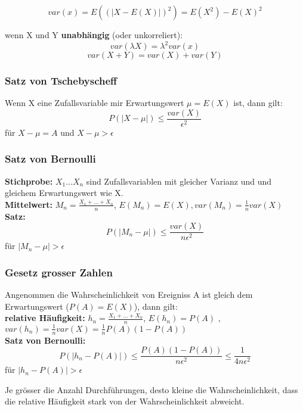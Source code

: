 \documentclass[margin=normal]{tex/hsrzf}
\begin{document}
\begin{multicols}{2}
    $$var(x) = E((|X-E(X)|)^2) = E(X^2) - E(X)^2$$

    wenn X und Y \textbf{unabhängig} (oder unkorreliert):
    $$var(\lambda X) = \lambda^2 var(x)$$
    $$var(X+Y) = var(X) + var(Y)$$

    \subsubsection*{Satz von Tschebyscheff}
    Wenn X eine Zufallsvariable mir Erwartungswert $\mu = E(X)$ ist, dann gilt:
    $$P(|X-\mu|)\leq \frac{var(X)}{\epsilon^2}$$
    für $X-\mu = A$ und $X-\mu > \epsilon$

    \subsubsection*{Satz von Bernoulli}
    \textbf{Stichprobe:} $X_1 \dots X_n$ sind Zufallsvariablen mit gleicher Varianz und und gleichem Erwartungswert wie X.
    \\ \textbf{Mittelwert:} $M_n = \frac{X_1+\dots+ X_n}{n}$, $E(M_n) = E(X), var(M_n) =\frac{1}{n} var(X)$
    \\ \textbf{Satz:} $$P(|M_n -\mu|) \leq \frac{var(X)}{n\epsilon^2} $$
    für $|M_n -\mu| > \epsilon$
    \subsubsection*{Gesetz grosser Zahlen}
    Angenommen die Wahrscheinlichkeit von Ereigniss A ist gleich dem Erwartungswert ($P(A) = E(X)$), dann gilt:
    \\ \textbf{relative Häufigkeit:} $h_n = \frac{X_1+ \dots + X_n}{n}$, $E(h_n) = P(A)$ , $ var(h_n) = \frac{1}{n} var(X) = \frac{1}{n}P(A)(1-P(A))$
    \\ \textbf{Satz von Bernoulli:}
    $$P(|h_n - P(A)|) \leq \frac{P(A)(1-P(A))}{n\epsilon^2} \leq \frac{1}{4n\epsilon^2} $$
    für $|h_n - P(A)| > \epsilon$

    \tiny{Je grösser die Anzahl Durchführungen, desto kleine die Wahrscheinlichkeit, dass die relative Häufigkeit stark von der Wahrscheinlichkeit abweicht.}
\end{multicols}
\end{document}
